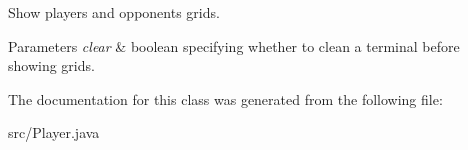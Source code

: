 Show player\textquotesingle{}s and opponent\textquotesingle{}s grids. 


\begin{DoxyParams}{Parameters}
{\em clear} & boolean specifying whether to clean a terminal before showing grids. \\
\hline
\end{DoxyParams}


The documentation for this class was generated from the following file\+:\begin{DoxyCompactItemize}
\item 
src/Player.\+java\end{DoxyCompactItemize}
